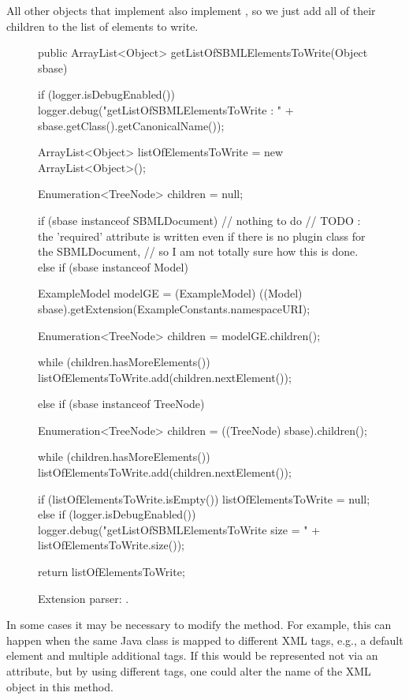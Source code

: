 All other objects that implement \SBase{} also implement \TreeNode, so we just add
all of their children to the list of elements to write.

\begin{figure}[htb]
  \begin{example}[numbers=left]
public ArrayList<Object> getListOfSBMLElementsToWrite(Object sbase) {

  if (logger.isDebugEnabled()) {
    logger.debug("getListOfSBMLElementsToWrite : " + sbase.getClass().getCanonicalName());
  }

  ArrayList<Object> listOfElementsToWrite = new ArrayList<Object>();

  Enumeration<TreeNode> children = null;

  if (sbase instanceof SBMLDocument) {
    // nothing to do
    // TODO : the 'required' attribute is written even if there is no plugin class for the SBMLDocument, 
    // so I am not totally sure how this is done.
  }
  else if (sbase instanceof Model) {
    ExampleModel modelGE = (ExampleModel) ((Model) sbase).getExtension(ExampleConstants.namespaceURI);

    Enumeration<TreeNode> children = modelGE.children();

    while (children.hasMoreElements()) {
      listOfElementsToWrite.add(children.nextElement());
    }
  }
  else if (sbase instanceof TreeNode) {
    Enumeration<TreeNode> children = ((TreeNode) sbase).children();

    while (children.hasMoreElements()) {
      listOfElementsToWrite.add(children.nextElement());
    }
  }

  if (listOfElementsToWrite.isEmpty()) {
    listOfElementsToWrite = null;
  } else if (logger.isDebugEnabled()) {
    logger.debug("getListOfSBMLElementsToWrite size = " + listOfElementsToWrite.size());
  }

  return listOfElementsToWrite;
}\end{example}
  \caption{Extension parser: .}
  \label{lst:ModelExtParserListSBMLToWrite}
\end{figure}

In some cases it may be necessary to modify the 
method.  For example, this can happen when the same Java class is mapped to
different XML tags, e.g., a default element and multiple additional tags.
If this would be represented not via an attribute, but by using different
tags, one could alter the name of the XML object in this method.

